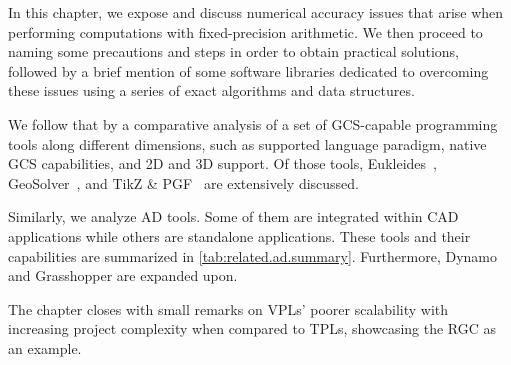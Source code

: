 %
\label{chap:related}
\cleardoublepage{}

\noindent
In this chapter, we expose and discuss numerical accuracy issues that arise when
performing computations with fixed-precision arithmetic.  We then proceed to
naming some precautions and steps in order to obtain practical solutions,
followed by a brief mention of some software libraries dedicated to overcoming
these issues using a series of exact algorithms and data structures.

We follow that by a comparative analysis of a set of \ac{GCS}-capable
programming tools along different dimensions, such as supported language
paradigm, native \ac{GCS} capabilities, and 2D and 3D support.  Of those tools,
Eukleides~\cite{Obrecht:2010:EM}, GeoSolver~\cite{Van:2009:NRCRASSGC}, and
\acs{TikZ} \& \acs{PGF}~\cite{Tantau:2021:TikZ} are extensively discussed.

Similarly, we analyze \ac{AD} tools.  Some of them are integrated within
\ac{CAD} applications while others are standalone applications.  These tools and
their capabilities are summarized in \cref{tab:related.ad.summary}.
Furthermore, Dynamo and Grasshopper are expanded upon.

The chapter closes with small remarks on \acp{VPL}' poorer scalability with
increasing project complexity when compared to \acp{TPL}, showcasing the
\ac{RGC} as an example.





